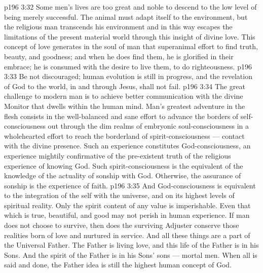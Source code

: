 \vs p196 3:32 Some men’s lives are too great and noble to descend to the low level of being merely successful. The animal must adapt itself to the environment, but the religious man transcends his environment and in this way escapes the limitations of the present material world through this insight of divine love. This concept of love generates in the soul of man that superanimal effort to find truth, beauty, and goodness; and when he does find them, he is glorified in their embrace; he is consumed with the desire to live them, to do righteousness.
\vs p196 3:33 Be not discouraged; human evolution is still in progress, and the revelation of God to the world, in and through Jesus, shall not fail.
\vs p196 3:34 The great challenge to modern man is to achieve better communication with the divine Monitor that dwells within the human mind. Man’s greatest adventure in the flesh consists in the well\hyp{}balanced and sane effort to advance the borders of self\hyp{}consciousness out through the dim realms of embryonic soul\hyp{}consciousness in a wholehearted effort to reach the borderland of spirit\hyp{}consciousness --- contact with the divine presence. Such an experience constitutes God\hyp{}consciousness, an experience mightily confirmative of the pre\hyp{}existent truth of the religious experience of knowing God. Such spirit\hyp{}consciousness is the equivalent of the knowledge of the actuality of sonship with God. Otherwise, the assurance of sonship is the experience of faith.
\vs p196 3:35 And God\hyp{}consciousness is equivalent to the integration of the self with the universe, and on its highest levels of spiritual reality. Only the spirit content of any value is imperishable. Even that which is true, beautiful, and good may not perish in human experience. If man does not choose to survive, then does the surviving Adjuster conserve those realities born of love and nurtured in service. And all these things are a part of the Universal Father. The Father is living love, and this life of the Father is in his Sons. And the spirit of the Father is in his Sons’ sons --- mortal men. When all is said and done, the Father idea is still the highest human concept of God.
\quizlink
